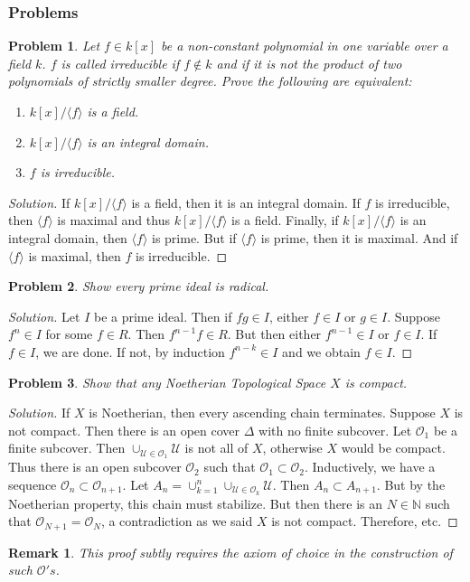 \documentclass{article}
\theoremstyle{mystyle}
\newtheorem{problem}{Problem}[section]
\newtheorem{remark}{Remark}[section]
\begin{document}
\subsubsection{Problems}
\begin{problem}
Let $f\in k[x]$ be a non-constant polynomial in one variable over a field $k$. $f$ is called irreducible if $f\notin k$ and if it is not the product of two polynomials of strictly smaller degree. Prove the following are equivalent:
\begin{enumerate}
    \item $k[x]/\langle f\rangle$ is a field.
    \item $k[x]/\langle f\rangle$ is an integral domain.
    \item $f$ is irreducible.
\end{enumerate}
\end{problem}
\begin{proof}[Solution]
If $k[x]/\langle f\rangle$ is a field, then it is an integral domain. If $f$ is irreducible, then $\langle f\rangle$ is maximal and thus $k[x]/\langle f\rangle$ is a field. Finally, if $k[x]/\langle f\rangle$ is an integral domain, then $\langle f\rangle$ is prime. But if $\langle f\rangle$ is prime, then it is maximal. And if $\langle f\rangle$ is maximal, then $f$ is irreducible. 
\end{proof}
\begin{problem}
Show every prime ideal is radical.
\end{problem}
\begin{proof}[Solution]
Let $I$ be a prime ideal. Then if $fg\in I$, either $f\in I$ or $g\in I$. Suppose $f^n \in I$ for some $f\in R$. Then $f^{n-1}f \in R$. But then either $f^{n-1} \in I$ or $f\in I$. If $f\in I$, we are done. If not, by induction $f^{n-k} \in I$ and we obtain $f\in I$.
\end{proof}
\begin{problem}
Show that any Noetherian Topological Space $X$ is compact.
\end{problem}
\begin{proof}[Solution]
If $X$ is Noetherian, then every ascending chain terminates. Suppose $X$ is not compact. Then there is an open cover $\Delta$ with no finite subcover. Let $\mathcal{O}_1$ be a finite subcover. Then $\cup_{\mathcal{U}\in \mathcal{O}_1} \mathcal{U}$ is not all of $X$, otherwise $X$ would be compact. Thus there is an open subcover $\mathcal{O}_2$ such that $\mathcal{O}_1 \subset \mathcal{O}_2$. Inductively, we have a sequence $\mathcal{O}_n\subset \mathcal{O}_{n+1}$. Let $A_n = \cup_{k=1}^{n} \cup_{\mathcal{U}\in \mathcal{O}_k}\mathcal{U}$. Then $A_{n}\subset A_{n+1}$. But by the Noetherian property, this chain must stabilize. But then there is an $N\in \mathbb{N}$ such that $\mathcal{O}_{N+1} = \mathcal{O}_N$, a contradiction as we said $X$ is not compact. Therefore, etc.
\end{proof}
\begin{remark}
This proof subtly requires the axiom of choice in the construction of such $\mathcal{O}'s$.
\end{remark}
\end{document}
